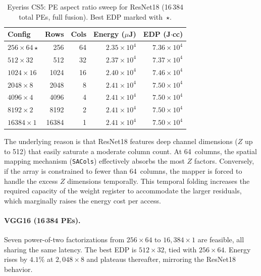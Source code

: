 \begin{table}[htbp]
  \centering
  \caption{Eyeriss CS5: PE aspect ratio sweep for ResNet18
    (16\,384 total PEs, full fusion).
    Best EDP marked with~$\star$.}
  \label{tab:eyeriss-cs5}
  \begin{tabular}{lrrrr}
    \toprule
    Config & Rows & Cols & Energy ($\mu$J) & EDP (J$\cdot$cc) \\
    \midrule
    $256 \times 64$\,$\star$
           & 256   & 64  & $2.35 \times 10^{4}$ & $7.36 \times 10^{4}$ \\
    $512 \times 32$
           & 512   & 32  & $2.37 \times 10^{4}$ & $7.37 \times 10^{4}$ \\
    $1024 \times 16$
           & 1024  & 16  & $2.40 \times 10^{4}$ & $7.46 \times 10^{4}$ \\
    $2048 \times 8$
           & 2048  &  8  & $2.41 \times 10^{4}$ & $7.50 \times 10^{4}$ \\
    $4096 \times 4$
           & 4096  &  4  & $2.41 \times 10^{4}$ & $7.50 \times 10^{4}$ \\
    $8192 \times 2$
           & 8192  &  2  & $2.41 \times 10^{4}$ & $7.50 \times 10^{4}$ \\
    $16384 \times 1$
           &16384  &  1  & $2.41 \times 10^{4}$ & $7.50 \times 10^{4}$ \\
    \bottomrule
  \end{tabular}
\end{table}
The underlying reason is that ResNet18 features deep channel dimensions ($Z$ up to 512) that easily saturate a moderate column count. At 64~columns, the spatial mapping mechanism (\texttt{SACols}) effectively absorbs the most $Z$ factors. Conversely, if the array is constrained to fewer than 64~columns, the mapper is forced to handle the excess $Z$ dimensions temporally. This temporal folding increases the required capacity of the weight register to accommodate the larger residuals, which marginally raises the energy cost per access.

\paragraph{VGG16 (16\,384 PEs).}
Seven power-of-two factorizations from $256 \times 64$ to
$16{,}384 \times 1$ are feasible, all sharing the same latency.
The best EDP is $512 \times 32$, tied with $256 \times 64$.
Energy rises by $4.1\%$ at
$2{,}048 \times 8$ and plateaus thereafter, mirroring the ResNet18
behavior.

